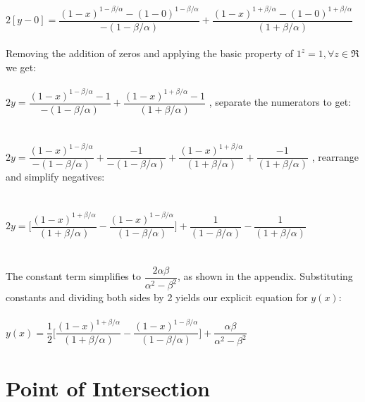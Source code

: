 \documentclass[12pt]{article}
\begin{document}
	\\
	\\
	$2[y-0]=\dfrac{(1-x)^{1-\beta/\alpha}-(1-0)^{1-\beta/\alpha}}{-(1-\beta/\alpha)}+\dfrac{(1-x)^{1+\beta/\alpha}-(1-0)^{1+\beta/\alpha}}{(1+\beta/\alpha)}$
	\\
	\\
	\indent Removing the addition of zeros and applying the basic property of $1^{z}=1, \forall z \in \Re$ we get:
	\\
	\\
	$2y=\dfrac{(1-x)^{1-\beta/\alpha}-1}{-(1-\beta/\alpha)}+\dfrac{(1-x)^{1+\beta/\alpha}-1}{(1+\beta/\alpha)}$ \hspace{4.15cm}, separate the numerators to get:
	\\
	\\
	\\
	$2y=\dfrac{(1-x)^{1-\beta/\alpha}}{-(1-\beta/\alpha)}+\dfrac{-1}{-(1-\beta/\alpha)}+\dfrac{(1-x)^{1+\beta/\alpha}}{(1+\beta/\alpha)}+\dfrac{-1}{(1+\beta/\alpha)}$ \hspace{0.4cm} , rearrange and simplify negatives:
	\\
	\\
	\\
	$2y=\bigg[ \dfrac{(1-x)^{1+\beta/\alpha}}{(1+\beta/\alpha)}-\dfrac{(1-x)^{1-\beta/\alpha}}{(1-\beta/\alpha)} \bigg] +\dfrac{1}{(1-\beta/\alpha)}-\dfrac{1}{(1+\beta/\alpha)}$
	\\
	\\
	\\
	\indent The constant term simplifies to $\dfrac{2\alpha\beta}{\alpha^2-\beta^2}$, as shown in the appendix. Substituting constants and dividing both sides by 2 yields our explicit equation for $y(x)$:
	\\
	\\
	$y(x)=\dfrac{1}{2}\bigg[ \dfrac{(1-x)^{1+\beta/\alpha}}{(1+\beta/\alpha)}-\dfrac{(1-x)^{1-\beta/\alpha}}{(1-\beta/\alpha)} \bigg] +\dfrac{\alpha\beta}{\alpha^2-\beta^2}$
	
	\section{Point of Intersection}
	
\end{document}
